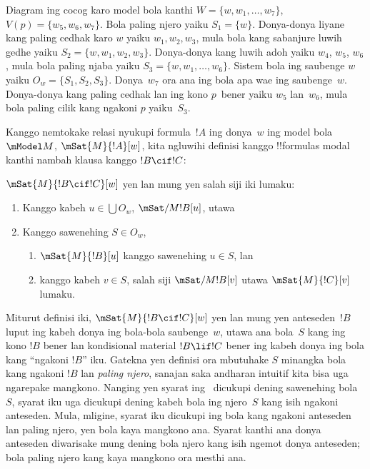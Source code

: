 \documentclass[../../../include/open-logic-section]{subfiles}
\begin{document}
Diagram ing  cocog karo model bola kanthi
$W = \{w, w_1, \dots, w_7\}$, $V(p) = \{w_5, w_6, w_7\}$.
Bola paling njero yaiku $S_1 = \{w\}$. Donya-donya liyane kang paling
cedhak karo $w$ yaiku $w_1, w_2, w_3$, mula bola kang sabanjure
luwih gedhe yaiku $S_2 = \{w, w_1, w_2, w_3\}$. Donya-donya
kang luwih adoh yaiku $w_4$, $w_5$, $w_6$, mula bola paling
njaba yaiku $S_3 = \{w, w_1, \dots, w_6\}$. Sistem bola ing
saubenge $w$ yaiku $O_w = \{S_1, S_2, S_3\}$. Donya~$w_7$
ora ana ing bola apa wae ing saubenge~$w$. Donya-donya kang
paling cedhak lan ing kono $p$~bener yaiku $w_5$ lan~$w_6$,
mula bola paling cilik kang ngakoni $p$ yaiku~$S_3$.

Kanggo nemtokake relasi nyukupi formula~$!A$ ing donya~$w$ ing
model bola~$\mModel M$, $\mSat{M}{!A}[w]$, kita ngluwihi
definisi kanggo !!{formula}s modal kanthi nambah klausa
kanggo $!B \cif !C$:

\begin{defn}
  $\mSat{M}{!B \cif !C}[w]$ yen lan mung yen salah siji iki lumaku:
  \begin{enumerate}
  \item{} Kanggo kabeh $u \in \bigcup O_w$,
    $\mSat/{M}{!B}[u]$, utawa
  \item{} Kanggo sawenehing $S \in O_w$,
    \begin{enumerate}
      \item $\mSat{M}{!B}[u]$ kanggo sawenehing $u \in S$, lan
      \item kanggo kabeh $v \in S$, salah siji
        $\mSat/{M}{!B}[v]$ utawa $\mSat{M}{!C}[v]$ lumaku.
    \end{enumerate}
  \end{enumerate}
\end{defn}

Miturut definisi iki, $\mSat{M}{!B \cif !C}[w]$ yen lan mung
yen anteseden~$!B$ luput ing kabeh donya ing bola-bola saubenge~$w$,
utawa ana bola~$S$ kang ing kono $!B$ bener lan kondisional
material $!B \lif !C$ bener ing kabeh donya ing bola kang
``ngakoni $!B$'' iku. Gatekna yen definisi ora mbutuhake
$S$ minangka bola kang ngakoni $!B$ lan \emph{paling njero},
sanajan saka andharan intuitif kita bisa uga ngarepake
mangkono. Nanging yen syarat ing~
dicukupi dening sawenehing bola~$S$, syarat iku uga dicukupi
dening kabeh bola ing njero~$S$ kang isih ngakoni anteseden.
Mula, mligine, syarat iku dicukupi ing bola kang ngakoni
anteseden lan paling njero, yen bola kaya mangkono ana.
Syarat kanthi ana donya anteseden diwarisake mung dening bola njero kang isih ngemot donya anteseden; bola paling njero kang kaya mangkono ora mesthi ana.
\end{document}

